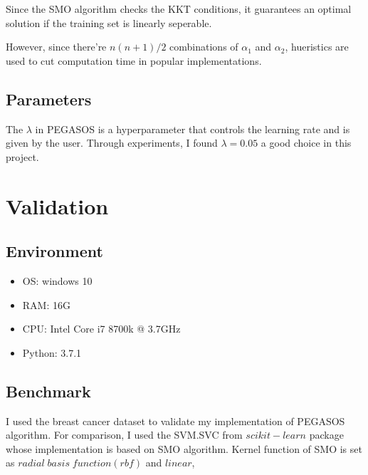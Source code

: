 \documentclass[conference]{IEEEtran}
\begin{document}
    Since the SMO algorithm checks the KKT conditions, it guarantees an optimal solution if the training set is linearly seperable.

    However, since there're $n(n+1)/2$ combinations of $\alpha_1$ and $\alpha_2$, hueristics are used to cut computation time in popular implementations.
\subsection{Parameters}

The $\lambda$ in PEGASOS is a hyperparameter that controls the learning rate and is given by the user. Through experiments, I found $\lambda = 0.05$ a good choice in this project.

\section{Validation}
\subsection{Environment}     
\begin{itemize}
    \item OS: windows 10
    \item RAM: 16G
    \item CPU: Intel Core i7 8700k @ 3.7GHz
    \item Python: 3.7.1
\end{itemize}

\subsection{Benchmark}
I used the breast cancer dataset to validate my implementation of PEGASOS algorithm. For comparison, I used the SVM.SVC from $scikit-learn$ package whose implementation is based on SMO algorithm. Kernel function of SMO is set as $radial\; basis\; function (rbf)$ and $linear$, 
\end{document}
